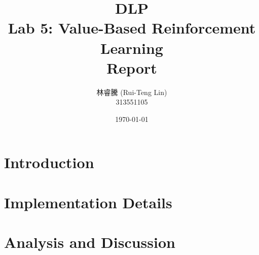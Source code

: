 \documentclass[11pt]{article}
\title{DLP\\ Lab 5: Value-Based Reinforcement Learning\\Report}
\author{林睿騰 (Rui-Teng Lin)\\
313551105}
\date{\today}
\begin{document}
\begin{CJK*}{UTF8}{bsmi}  %
    \maketitle



    \newpage

    \tableofcontents

    \newpage

    \section{Introduction}
    

    \section{Implementation Details}
    

    \section{Analysis and Discussion}
    



\end{CJK*}  %
\end{document}
